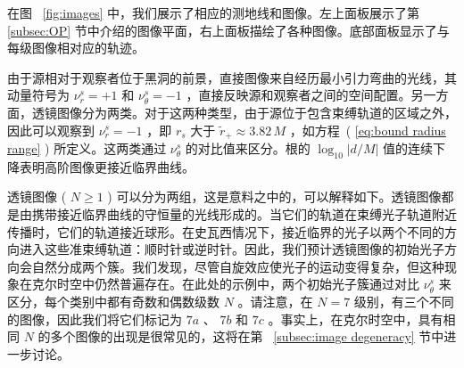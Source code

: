 \documentclass[aps,reprint,superscriptaddress,nofootinbib,floatfix,longbibliography,preprintnumbers]{revtex4-1}
\begin{document}
在图~   \ref{fig:images}   中，我们展示了相应的测地线和图像。左上面板展示了第~   \ref{subsec:OP}   节中介绍的图像平面，右上面板描绘了各种图像。底部面板显示了与每级图像相对应的轨迹。  

由于源相对于观察者位于黑洞的前景，直接图像来自经历最小引力弯曲的光线，其动量符号为    $\nu_r^s = +1$    和    $\nu_\theta^s = -1$    ，直接反映源和观察者之间的空间配置。另一方面，透镜图像分为两类。对于这两种类型，由于源位于包含束缚轨道的区域之外，因此可以观察到    $\nu_r^s = -1$    ，即    $r_s$    大于    $\tilde{r}_+ \approx 3.82\,M$    ，如方程~(    \ref{eq:bound radius range}    ) 所定义。这两类通过    $\nu_\theta^s$    的对比值来区分。根的    $\log_{10}|d/M|$    值的连续下降表明高阶图像更接近临界曲线。  

透镜图像 (    $N \geq 1$    ) 可以分为两组，这是意料之中的，可以解释如下。透镜图像都是由携带接近临界曲线的守恒量的光线形成的。当它们的轨道在束缚光子轨道附近传播时，它们的轨道接近球形。在史瓦西情况下，接近临界的光子以两个不同的方向进入这些准束缚轨道：顺时针或逆时针。因此，我们预计透镜图像的初始光子方向会自然分成两个簇。我们发现，尽管自旋效应使光子的运动变得复杂，但这种现象在克尔时空中仍然普遍存在。在此处的示例中，两个初始光子簇通过对比    $\nu_\theta^s$    来区分，每个类别中都有奇数和偶数级数    $N$   。请注意，在    $N = 7$    级别，有三个不同的图像，因此我们将它们标记为    $7a$    、    $7b$    和    $7c$    。事实上，在克尔时空中，具有相同    $N$    的多个图像的出现是很常见的，这将在第~    \ref{subsec:image degeneracy}    节中进一步讨论。
\end{document}
